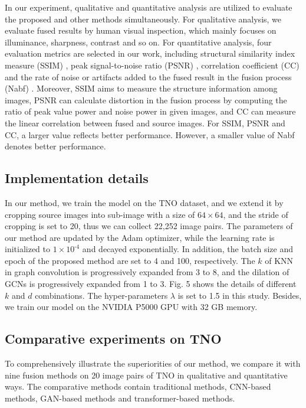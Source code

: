 \documentclass[journal]{IEEEtran}
\begin{document}
In our experiment, qualitative and quantitative analysis are utilized to evaluate the proposed and other methods simultaneously. For qualitative analysis, we evaluate fused results by human visual inspection, which mainly focuses on illuminance, sharpness, contrast and so on. For quantitative analysis, four evaluation metrics are selected in our work, including structural similarity index measure (SSIM) \cite{wang2004image}, peak signal-to-noise ratio (PSNR) \cite{ma2016infrared}, correlation coefficient (CC) \cite{ma2019infrared} and the rate of noise or artifacts added to the fused result in the fusion process (Nabf) \cite{kumar2013multifocus}. Moreover, SSIM aims to measure the structure information among images, PSNR can calculate distortion in the fusion process by computing the ratio of peak value power and noise power in given images, and CC can measure the linear correlation between fused and source images. For SSIM, PSNR and CC, a larger value reflects better performance. However, a smaller value of Nabf denotes better performance.

\subsection{Implementation details}
 In our method, we train the model on the TNO dataset, and we extend it by cropping source images into sub-image with a size of $64\times 64$, and the stride of cropping is set to 20, thus we can collect 22,252 image pairs. The parameters of our method are updated by the Adam optimizer, while the learning rate is initialized to $1\times {{10}^{\text{-}4}}$ and decayed exponentially. In addition, the batch size and epoch of the proposed method are set to 4 and 100, respectively. The $k$ of KNN in graph convolution is progressively expanded from 3 to 8, and the dilation of GCNs is progressively expanded from 1 to 3. Fig. 5 shows the details of different $k$ and $d$ combinations. The hyper-parameters $\lambda$ is set to 1.5 in this study. Besides, we train our model on the NVIDIA P5000 GPU with 32 GB memory.

\subsection{Comparative experiments on TNO}
To comprehensively illustrate the superiorities of our method, we compare it with nine fusion methods on 20 image pairs of TNO in qualitative and quantitative ways. The comparative methods contain traditional methods, CNN-based methods, GAN-based methods and transformer-based methods.
\end{document}
